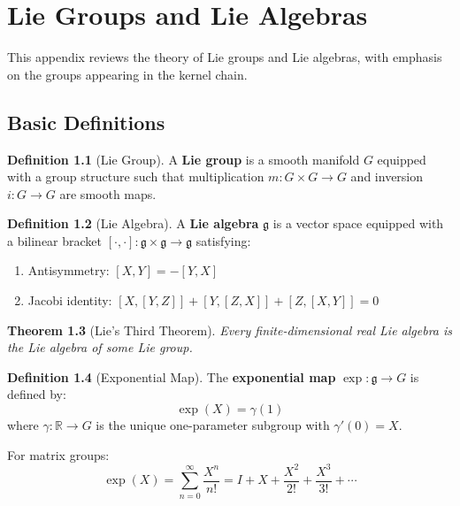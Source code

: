 \documentclass[11pt,a4paper,openright]{book}
\theoremstyle{plain}
\newtheorem{theorem}{Theorem}[chapter]
\theoremstyle{definition}
\newtheorem{definition}[theorem]{Definition}
\newcommand{\R}{\mathbb{R}}
\newcommand{\g}{\mathfrak{g}}
\begin{document}
\chapter{Lie Groups and Lie Algebras}
\label{app:lie}

This appendix reviews the theory of Lie groups and Lie algebras, with emphasis on the groups appearing in the kernel chain.

\section{Basic Definitions}

\begin{definition}[Lie Group]
A \textbf{Lie group} is a smooth manifold $G$ equipped with a group structure such that multiplication $m: G \times G \to G$ and inversion $i: G \to G$ are smooth maps.
\end{definition}

\begin{definition}[Lie Algebra]
A \textbf{Lie algebra} $\g$ is a vector space equipped with a bilinear bracket $[\cdot, \cdot]: \g \times \g \to \g$ satisfying:
\begin{enumerate}[label=(\roman*)]
    \item Antisymmetry: $[X, Y] = -[Y, X]$
    \item Jacobi identity: $[X, [Y, Z]] + [Y, [Z, X]] + [Z, [X, Y]] = 0$
\end{enumerate}
\end{definition}

\begin{theorem}[Lie's Third Theorem]
Every finite-dimensional real Lie algebra is the Lie algebra of some Lie group.
\end{theorem}

\begin{definition}[Exponential Map]
The \textbf{exponential map} $\exp: \g \to G$ is defined by:
\begin{equation}
\exp(X) = \gamma(1)
\end{equation}
where $\gamma: \R \to G$ is the unique one-parameter subgroup with $\gamma'(0) = X$.
\end{definition}

For matrix groups:
\begin{equation}
\exp(X) = \sum_{n=0}^\infty \frac{X^n}{n!} = I + X + \frac{X^2}{2!} + \frac{X^3}{3!} + \cdots
\end{equation}
\end{document}
